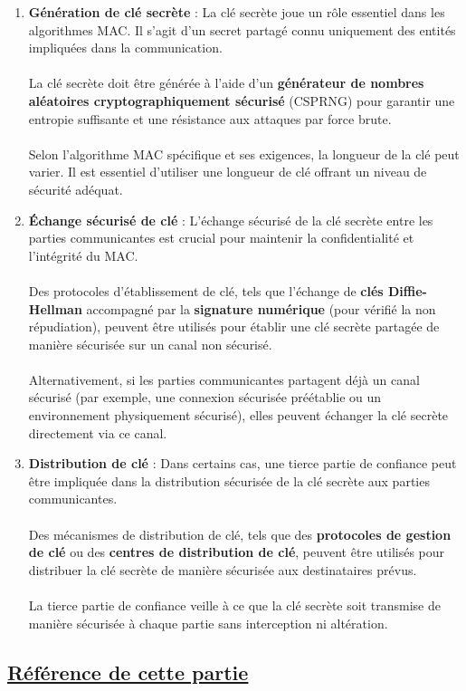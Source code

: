\begin{enumerate}
    \item \textbf{Génération de clé secrète }: La clé secrète joue un rôle essentiel dans les algorithmes MAC. Il s'agit d'un secret partagé connu uniquement des entités impliquées dans la communication.\\\\
    La clé secrète doit être générée à l'aide d'un \textbf{générateur de nombres aléatoires cryptographiquement sécurisé} (CSPRNG) pour garantir une entropie suffisante et une résistance aux attaques par force brute.\\\\
    Selon l'algorithme MAC spécifique et ses exigences, la longueur de la clé peut varier. Il est essentiel d'utiliser une longueur de clé offrant un niveau de sécurité adéquat.
    
    \item \textbf{Échange sécurisé de clé} : L'échange sécurisé de la clé secrète entre les parties communicantes est crucial pour maintenir la confidentialité et l'intégrité du MAC.\\\\
    Des protocoles d'établissement de clé, tels que l'échange de \textbf{clés Diffie-Hellman} accompagné par la \textbf{signature numérique} (pour vérifié la non répudiation), peuvent être utilisés pour établir une clé secrète partagée de manière sécurisée sur un canal non sécurisé.\\\\
    Alternativement, si les parties communicantes partagent déjà un canal sécurisé (par exemple, une connexion sécurisée préétablie ou un environnement physiquement sécurisé), elles peuvent échanger la clé secrète directement via ce canal.\\
    
    \item \textbf{Distribution de clé} : Dans certains cas, une tierce partie de confiance peut être impliquée dans la distribution sécurisée de la clé secrète aux parties communicantes.\\\\
    Des mécanismes de distribution de clé, tels que des \textbf{protocoles de gestion de clé} ou des \textbf{centres de distribution de clé}, peuvent être utilisés pour distribuer la clé secrète de manière sécurisée aux destinataires prévus.\\\\
    La tierce partie de confiance veille à ce que la clé secrète soit transmise de manière sécurisée à chaque partie sans interception ni altération.
    \newline \newline \newline
\end{enumerate}


\subsection{\textbf{\underline{Référence de cette partie}}}
\begin{center}
    \cite{wiki:mac}\\
    \cite{openclassrooms:mac}\\
    \cite{principe:mac}\\
    \cite{saied2014lightweight}\\
    \cite{dasari2015random}\\
    \cite{boumso2006methode}\\
\end{center}

